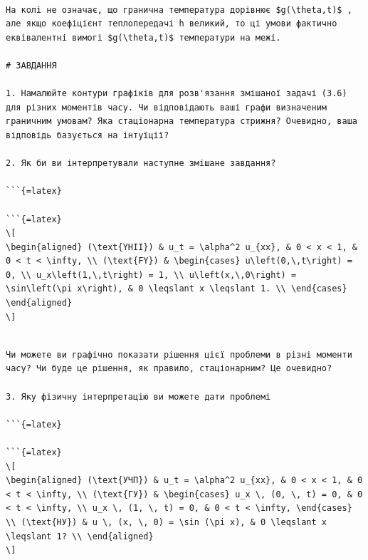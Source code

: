 \documentclass[
  ukrainian,
]{article}
\begin{document}
\begin{verbatim}

На колі не означає, що гранична температура дорівнює $g(\theta,t)$ , але якщо коефіцієнт теплопередачі h великий, то ці умови фактично еквівалентні вимогі $g(\theta,t)$ температури на межі.

# ЗАВДАННЯ

1. Намалюйте контури графіків для розв'язання змішаної задачі (3.6) для різних моментів часу. Чи відповідають ваші графи визначеним граничним умовам? Яка стаціонарна температура стрижня? Очевидно, ваша відповідь базується на інтуїції?

2. Як би ви інтерпретували наступне змішане завдання?

```{=latex}

```{=latex}
\[
\begin{aligned} (\text{YHII}) & u_t = \alpha^2 u_{xx}, & 0 < x < 1, & 0 < t < \infty, \\ (\text{FY}) & \begin{cases} u\left(0,\,t\right) = 0, \\ u_x\left(1,\,t\right) = 1, \\ u\left(x,\,0\right) = \sin\left(\pi x\right), & 0 \leqslant x \leqslant 1. \\ \end{cases} \end{aligned}
\]
\end{verbatim}

\begin{verbatim}

Чи можете ви графічно показати рішення цієї проблеми в різні моменти часу? Чи буде це рішення, як правило, стаціонарним? Це очевидно?

3. Яку фізичну інтерпретацію ви можете дати проблемі

```{=latex}

```{=latex}
\[
\begin{aligned} (\text{УЧП}) & u_t = \alpha^2 u_{xx}, & 0 < x < 1, & 0 < t < \infty, \\ (\text{ГУ}) & \begin{cases} u_x \, (0, \, t) = 0, & 0 < t < \infty, \\ u_x \, (1, \, t) = 0, & 0 < t < \infty, \end{cases} \\ (\text{НУ}) & u \, (x, \, 0) = \sin (\pi x), & 0 \leqslant x \leqslant 1? \\ \end{aligned}
\]
\end{verbatim}
\end{document}
